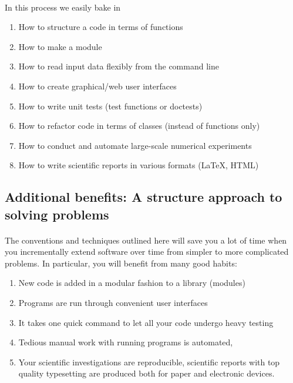 \documentclass[%
twoside,                 %
final,                   %
10pt]{article}
\begin{document}
\paragraph{}
In this process we easily bake in
\begin{enumerate}
  \item How to structure a code in terms of functions

  \item How to make a module

  \item How to read input data flexibly from the command line

  \item How to create graphical/web user interfaces

  \item How to write unit tests (test functions or doctests)

  \item How to refactor code in terms of classes (instead of functions only)

  \item How to conduct and automate large-scale numerical experiments

  \item How to write scientific reports in various formats ({\LaTeX}, HTML)
\end{enumerate}

\noindent




\subsection*{Additional benefits: A structure approach to solving problems}

\paragraph{}
The conventions and techniques outlined here will save you a lot of time when you incrementally extend software over time from simpler to more complicated problems. In particular, you will benefit from many good habits:
\begin{enumerate}
\item New code is added in a modular fashion to a library (modules)

\item Programs are run through convenient user interfaces

\item It takes one quick command to let all your code undergo heavy testing 

\item Tedious manual work with running programs is automated,

\item Your scientific investigations are reproducible, scientific reports with top quality typesetting are produced both for paper and electronic devices.
\end{enumerate}
\end{document}
